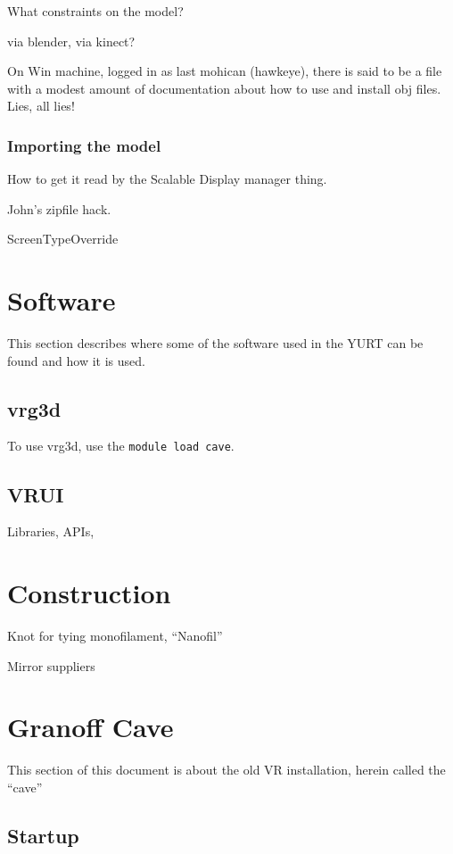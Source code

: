\documentclass[11pt]{article}
\newcommand{\yurt}{YURT\xspace}
\newcommand{\cmd}[1]{\texttt{#1}\xspace}
\begin{document}
What constraints on the model?

via blender, via kinect?

On Win machine, logged in as last mohican (hawkeye), there is said to
be a file with a modest amount of documentation about how to use and
install obj files.  Lies, all lies!


\subsubsection{Importing the model}

How to get it read by the Scalable Display manager thing.

John's zipfile hack.


ScreenTypeOverride


\section{Software}

This section describes where some of the software used in the \yurt
can be found and how it is used.  

\subsection{vrg3d}

To use vrg3d, use the \cmd{module load cave}.

\subsection{VRUI}



Libraries, APIs,


\section{Construction}

Knot for tying monofilament, ``Nanofil''

Mirror suppliers



\section{Granoff Cave}

This section of this document is about the old VR installation, herein
called the ``cave''

\subsection{Startup}
\end{document}
